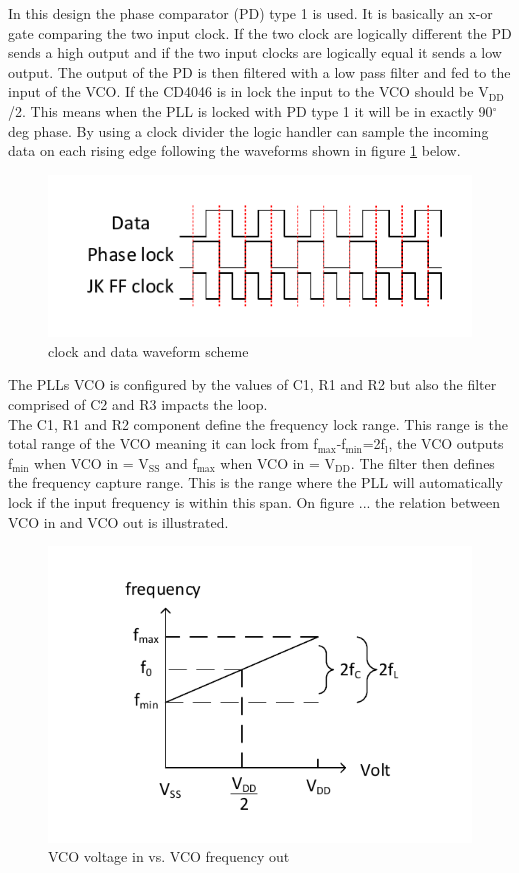 In this design the phase comparator (PD) type 1 is used. It is basically an x-or gate comparing the two input clock. If the two clock are logically different the PD sends a high output and if the two input clocks are logically equal it sends a low output. The output of the PD is then filtered with a low pass filter and fed to the input of the VCO. If the CD4046 is in lock the input to the VCO should be V$_{\text{DD}}$/2. This means when the PLL is locked with PD type 1 it will be in exactly 90$^{\circ}$deg phase. By using a clock divider the logic handler can sample the incoming data
on each rising edge following the waveforms shown in figure \ref{fig:cd4046waveforms} below.

\begin{figure}[H]
	\centering
	\includegraphics[width=.7\textwidth]{billeder/cd4046waveforms}
	\caption{clock and data waveform scheme}
	\label{fig:cd4046waveforms}
\end{figure}

The PLLs VCO is configured by the values of C1, R1 and R2 but also the filter comprised of C2 and R3 impacts the loop.\\
The C1, R1 and R2 component define the frequency lock range. This range is the total range of the VCO meaning it can lock from f$_{\text{max}}$-f$_{\text{min}}$=2f$_{\text{l}}$, the VCO outputs f$_{\text{min}}$ when VCO in = V$_{\text{SS}}$ and f$_{\text{max}}$ when VCO in = V$_{\text{DD}}$. The filter then defines the frequency capture range. This is the range where the PLL will automatically lock if the input frequency is within this span. On figure ... the relation between VCO in and VCO out is illustrated.

\begin{figure}[H]
	\centering
	\includegraphics[width=.7\textwidth]{billeder/VCO_graph}
	\caption{VCO voltage in vs. VCO frequency out}
\end{figure}

